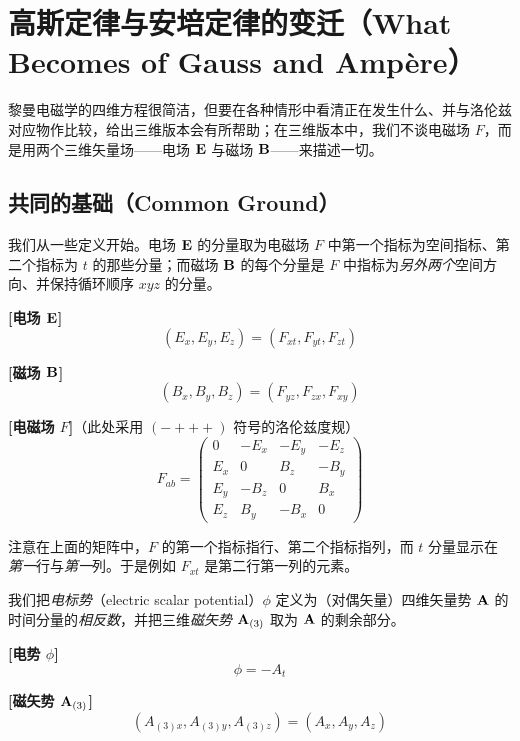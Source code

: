 \section{高斯定律与安培定律的变迁（What Becomes of Gauss and Ampère）}

黎曼电磁学的四维方程很简洁，但要在各种情形中看清正在发生什么、并与洛伦兹对应物作比较，给出三维版本会有所帮助；在三维版本中，我们不谈电磁场 $F$，而是用两个三维矢量场——电场 $\mathbf{E}$ 与磁场 $\mathbf{B}$——来描述一切。

\subsection{共同的基础（Common Ground）}

我们从一些定义开始。电场 $\mathbf{E}$ 的分量取为电磁场 $F$ 中第一个指标为空间指标、第二个指标为 $t$ 的那些分量；而磁场 $\mathbf{B}$ 的每个分量是 $F$ 中指标为\emph{另外两个}空间方向、并保持循环顺序 $xyz$ 的分量。

\begin{keybox}[电场、磁场与电磁场的定义]
\textbf{[电场 $\mathbf{E}$]}
\begin{equation}
(E_{x}, E_{y}, E_{z}) = (F_{xt}, F_{yt}, F_{zt}) \tag{Common}
\end{equation}

\textbf{[磁场 $\mathbf{B}$]}
\begin{equation}
(B_{x}, B_{y}, B_{z}) = (F_{yz}, F_{zx}, F_{xy}) \tag{Common}
\end{equation}

\textbf{[电磁场 $F$]}（此处采用 $(-+++)$ 符号的洛伦兹度规）
\begin{equation}
F_{ab} = \begin{pmatrix}
0 & -E_{x} & -E_{y} & -E_{z}\\
E_{x} & 0 & B_{z} & -B_{y}\\
E_{y} & -B_{z} & 0 & B_{x}\\
E_{z} & B_{y} & -B_{x} & 0
\end{pmatrix} \tag{Common}
\end{equation}
\end{keybox}

注意在上面的矩阵中，$F$ 的第一个指标指行、第二个指标指列，而 $t$ 分量显示在\emph{第一}行与\emph{第一}列。于是例如 $F_{xt}$ 是第二行第一列的元素。

我们把\emph{电标势}（electric scalar potential）$\phi$ 定义为（对偶矢量）四维矢量势 $\mathbf{A}$ 的时间分量的\emph{相反数}，并把三维\emph{磁矢势} $\mathbf{A}_{(3)}$ 取为 $\mathbf{A}$ 的剩余部分。

\begin{keybox}[电势与磁矢势]
\textbf{[电势 $\phi$]}
\begin{equation}
\phi = -A_{t} \tag{Common}
\end{equation}

\textbf{[磁矢势 $\mathbf{A}_{(3)}$]}
\begin{equation}
(A_{(3)x}, A_{(3)y}, A_{(3)z}) = (A_{x}, A_{y}, A_{z}) \tag{Common}
\end{equation}
\end{keybox}

